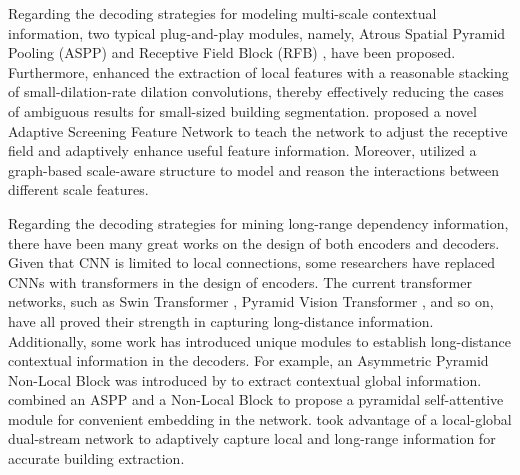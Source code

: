 \documentclass[lettersize,journal]{IEEEtran}
\begin{document}
\par
Regarding the decoding strategies for modeling multi-scale contextual information, two typical plug-and-play modules, namely, Atrous Spatial Pyramid Pooling (ASPP) \cite{Deeplabv3+} and Receptive Field Block (RFB) \cite{RFB}, have been proposed. Furthermore, \cite{small_object_segmentation} enhanced the extraction of local features with a reasonable stacking of small-dilation-rate dilation convolutions, thereby effectively reducing the cases of ambiguous results for small-sized building segmentation. \cite{ASF-Net} proposed a novel Adaptive Screening Feature Network to teach the network to adjust the receptive field and adaptively enhance useful feature information. Moreover, \cite{MSNet} utilized a graph-based scale-aware structure to model and reason the interactions between different scale features.

\par
Regarding the decoding strategies for mining long-range dependency information, there have been many great works on the design of both encoders and decoders. Given that CNN is limited to local connections, some researchers have replaced CNNs with transformers in the design of encoders. The current transformer networks, such as Swin Transformer \cite{SwinTransformer}, Pyramid Vision Transformer \cite{PVT}, and so on, have all proved their strength in capturing long-distance information. Additionally, some work has introduced unique modules to establish long-distance contextual information in the decoders. For example, an Asymmetric Pyramid Non-Local Block \cite{APNB} was introduced by \cite{Non-local-building} to extract contextual global information. \cite{Self-attention-building} combined an ASPP \cite{Deeplabv3+} and a Non-Local Block \cite{Non-local} to propose a pyramidal self-attentive module for convenient embedding in the network. \cite{DSNet} took advantage of a local-global dual-stream network to adaptively capture local and long-range information for accurate building extraction.
\end{document}
